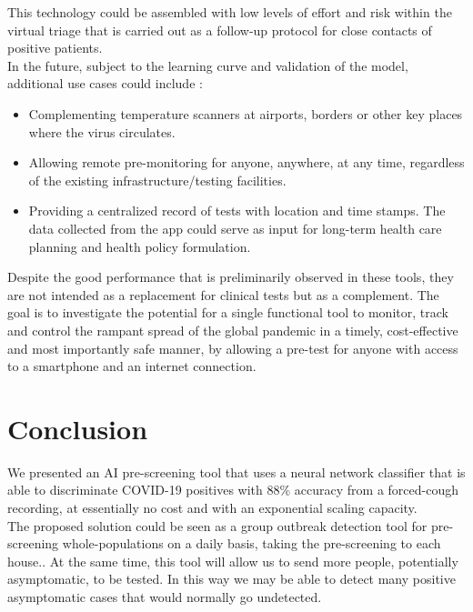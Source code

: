\documentclass{nle}
\begin{document}
This technology could be assembled with low levels of effort and risk within the virtual triage that is carried out as a follow-up protocol for close contacts of positive patients.\\

In the future, subject to the learning curve and validation of the model, additional use cases could include \cite{10}:
\begin{itemize}
    \item Complementing temperature scanners at airports, borders or other key places where the virus circulates.
    \item Allowing remote pre-monitoring for anyone, anywhere, at any time, regardless of the existing infrastructure/testing facilities.
    \item Providing a centralized record of tests with location and time stamps. The data collected from the app could serve as input for long-term health care planning and health policy formulation.
\end{itemize}

Despite the good performance that is preliminarily observed in these tools, they are not intended as a replacement for clinical tests but as a complement. The goal is to investigate the potential for a single functional tool to monitor, track and control the rampant spread of the global pandemic in a timely, cost-effective and most importantly safe manner, by allowing a pre-test for anyone with access to a smartphone and an internet connection.


\section{Conclusion}

We presented an AI pre-screening tool that uses  a neural network classifier that is able to discriminate COVID-19 positives with 88\%  accuracy from a forced-cough recording, at essentially no cost and with an exponential scaling capacity.\\

The proposed solution could be seen as a group outbreak detection tool for pre-screening whole-populations on a daily basis, taking the pre-screening to each house.. At the same time, this tool will allow us to send more people, potentially asymptomatic, to be tested. In this way we may be able to detect many positive asymptomatic cases that would normally go undetected.\\
\end{document}
